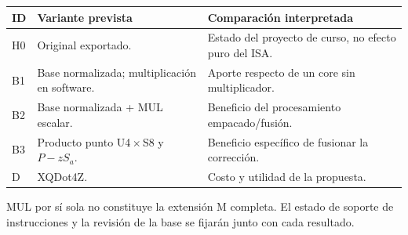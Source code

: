 \begin{tabularx}{\textwidth}{@{}lYY@{}}
\toprule
\textbf{ID} & \textbf{Variante prevista} & \textbf{Comparación interpretada}\\\midrule
H0 & Original exportado. & Estado del proyecto de curso, no efecto puro del ISA.\\
B1 & Base normalizada; multiplicación en software. & Aporte respecto de un core sin multiplicador.\\
B2 & Base normalizada + MUL escalar. & Beneficio del procesamiento empacado/fusión.\\
B3 & Producto punto U4\,$\times$\,S8 y \(P-zS_a\). & Beneficio específico de fusionar la corrección.\\
D & XQDot4Z. & Costo y utilidad de la propuesta.\\\bottomrule
\end{tabularx}\par
MUL por sí sola no constituye la extensión M completa. El estado de soporte
de instrucciones y la revisión de la base se fijarán junto con cada resultado.
